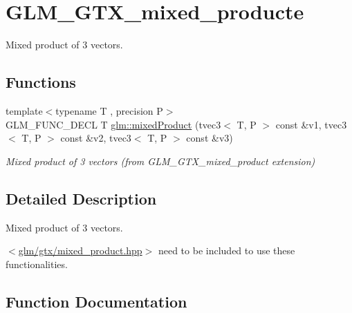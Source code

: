 \hypertarget{group__gtx__mixed__product}{}\section{G\+L\+M\+\_\+\+G\+T\+X\+\_\+mixed\+\_\+producte}
\label{group__gtx__mixed__product}


Mixed product of 3 vectors.  


\subsection*{Functions}
\begin{DoxyCompactItemize}
\item 
{\footnotesize template$<$typename T , precision P$>$ }\\G\+L\+M\+\_\+\+F\+U\+N\+C\+\_\+\+D\+E\+C\+L T \hyperlink{group__gtx__mixed__product_gaaee4cf80d69cb86de80f12af88b3c3af}{glm\+::mixed\+Product} (tvec3$<$ T, P $>$ const \&v1, tvec3$<$ T, P $>$ const \&v2, tvec3$<$ T, P $>$ const \&v3)
\begin{DoxyCompactList}\small\item\em Mixed product of 3 vectors (from G\+L\+M\+\_\+\+G\+T\+X\+\_\+mixed\+\_\+product extension) \end{DoxyCompactList}\end{DoxyCompactItemize}


\subsection{Detailed Description}
Mixed product of 3 vectors. 

$<$\hyperlink{mixed__product_8hpp}{glm/gtx/mixed\+\_\+product.\+hpp}$>$ need to be included to use these functionalities. 

\subsection{Function Documentation}
\hypertarget{group__gtx__mixed__product_gaaee4cf80d69cb86de80f12af88b3c3af}{}
